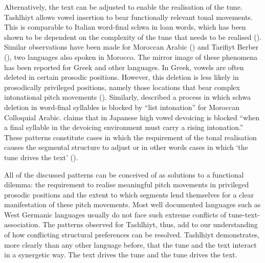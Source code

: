 Alternatively, the text can be adjusted to enable the realisation of the tune. Tashlhiyt allows vowel insertion to bear functionally relevant tonal movements. This is comparable to Italian word-final schwa in loan words, which has been shown to be dependent on the complexity of the tune that needs to be realised (\citealt{Grice.etal2015bari}). Similar observations have been made for Moroccan Arabic (\citealt{DE1985}) and Tarifiyt Berber (\citealt{DellTangi1992}), two languages also spoken in Morocco. The mirror image of these phenomena has been reported for Greek and other languages. In Greek, vowels are often deleted in certain prosodic positions. However, this deletion is less likely in prosodically privileged positions, namely those locations that bear complex intonational pitch movements (\citealt{Kaimaki2015}). Similarly, \citet[184]{Heath1987} described a process in which schwa deletion in word-final syllables is blocked by “list intonation” for Moroccan Colloquial Arabic. \citet[51]{Vance1987} claims that in Japanese high vowel devoicing is blocked “when a final syllable in the devoicing environment must carry a rising intonation.” These patterns constitute cases in which the requirement of the tonal realisation causes the segmental structure to adjust or in other words cases in which ‘the tune drives the text’ (\citealt{Grice.etal2015bari}).

All of the discussed patterns can be conceived of as solutions to a functional dilemma: the requirement to realise meaningful pitch movements in privileged prosodic positions and the extent to which segments lend themselves for a clear manifestation of these pitch movements. Most well documented languages such as West Germanic languages usually do not face such extreme conflicts of tune-text-association. The patterns observed for Tashlhiyt, thus, add to our understanding of how conflicting structural preferences can be resolved. Tashlhiyt demonstrates, more clearly than any other language before, that the tune and the text interact in a synergetic way. The text drives the tune and the tune drives the text.

